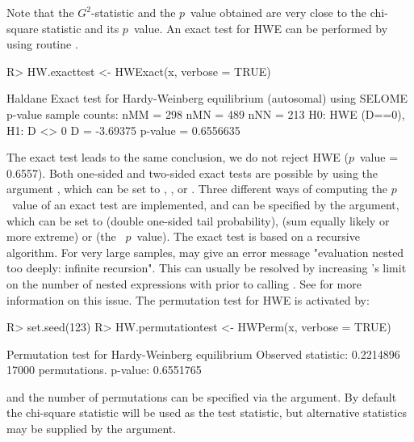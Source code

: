 \documentclass[nojss]{jss}
\begin{document}
%
%
Note that the $G^2$-statistic and the $p$~value obtained are very close to the chi-square statistic
and its $p$~value. An exact test for HWE can be performed by using routine . 
%
\begin{Schunk}
\begin{Sinput}
R> HW.exacttest <- HWExact(x, verbose = TRUE)
\end{Sinput}
\begin{Soutput}
Haldane Exact test for Hardy-Weinberg equilibrium (autosomal)
using SELOME p-value
sample counts: nMM =  298 nMN =  489 nNN =  213 
H0: HWE (D==0), H1: D <> 0 
D =  -3.69375 p-value =  0.6556635 
\end{Soutput}
\end{Schunk}
%

The exact test leads to the same conclusion, we do not reject HWE
($p$~value = 0.6557). Both one-sided and two-sided exact tests are
possible by using the argument , which can be set to
, , or . Three different ways
of computing the $p$~value of an exact test are implemented, and can be
specified by the  argument, which can be set to
 (double one-sided tail probability),  (sum
equally likely or more extreme) or  (the \midp\ $p$~value). The
exact test is based on a recursive algorithm. For very large samples,
 may give an error message "evaluation nested too deeply:
infinite recursion". This can usually be resolved by increasing
's limit on the number of nested expressions with
 prior to calling . See
 for more information on this issue. The permutation test for HWE is activated by:

\begin{Schunk}
\begin{Sinput}
R> set.seed(123)
R> HW.permutationtest <- HWPerm(x, verbose = TRUE)
\end{Sinput}
\begin{Soutput}
Permutation test for Hardy-Weinberg equilibrium
Observed statistic: 0.2214896   17000 permutations. p-value: 0.6551765 
\end{Soutput}
\end{Schunk}

and the number of permutations can be specified via the  
argument. By default the chi-square statistic will be used as the test statistic,
but alternative statistics may be supplied by the  argument.
\end{document}
